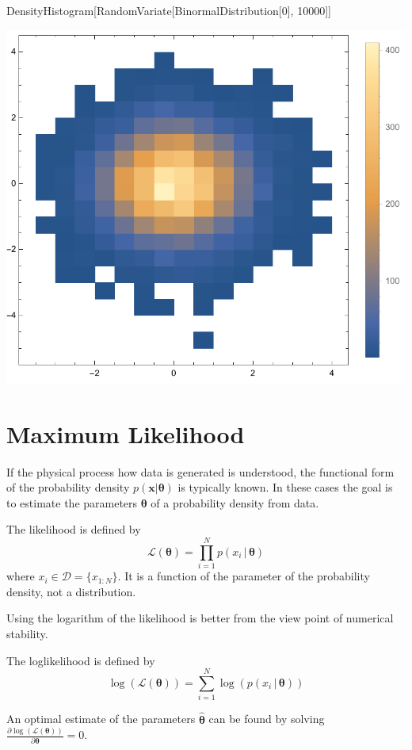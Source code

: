 \documentclass{tstextbook}
\begin{document}
 \begin{mathematica}
DensityHistogram[RandomVariate[BinormalDistribution[0], 10000]]
\end{mathematica}

 \includegraphics{images/density_histogram.pdf}     
  
\section{Maximum Likelihood}
If the physical process how data is generated is understood, the functional form of the probability density $p(\mathbf{x}\vert \boldsymbol{\theta})$ is typically known. In these cases the goal is to estimate the parameters $\boldsymbol{\theta}$ of a probability density from data.

\begin{definition}[Likelihood]
  \label{th:likelihood}
  The likelihood is defined by
  \begin{equation}
    \mathcal{L}(\boldsymbol{\theta}) = \prod_{i=1}^N p\left(x_i\,\vert\, \boldsymbol{\theta}\right)
  \end{equation}
where $x_i \in \mathcal{D}=\{x_{1:N}\}$. It is a function of the parameter of the probability density, not a distribution.
\end{definition}
Using the logarithm of the likelihood is better from the view point of numerical stability. 
\begin{definition}[Loglikelihood]
  \label{th:loglikelihood}
  The loglikelihood is defined by
  \begin{equation}
    \log(\mathcal{L}(\boldsymbol{\theta})) = \sum_{i=1}^N \log\left(p\left(x_i\,\vert\, \boldsymbol{\theta}\right)\right)
  \end{equation}
\end{definition}
An optimal estimate of the parameters $\hat{\boldsymbol{\theta}}$ can be found by solving 
$\frac{ \partial\log\left(\mathcal{L}(\boldsymbol{\theta})\right)}{\partial\boldsymbol{\theta}}=0$. 
\end{document}
